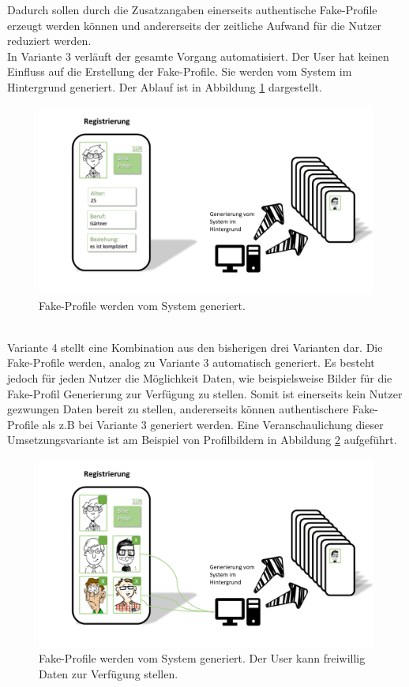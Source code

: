 \documentclass{sigchi}
\begin{document}
Dadurch sollen durch die Zusatzangaben einerseits authentische Fake-Profile erzeugt werden können und andererseits der zeitliche Aufwand für die Nutzer reduziert werden. \\
In Variante 3 verläuft der gesamte Vorgang automatisiert. Der User hat keinen Einfluss auf die Erstellung der Fake-Profile. Sie werden vom System im Hintergrund generiert. Der Ablauf ist in Abbildung \ref{fig:Umsetzung3} dargestellt.
\begin{figure}[htbp]
\centering
	\includegraphics[width=0.8\columnwidth]{figures/Umsetzung3.PNG}
	\caption{Fake-Profile werden vom System generiert.}
	\label{fig:Umsetzung3}
\end{figure}
\\
Variante 4 stellt eine Kombination aus den bisherigen drei Varianten dar. Die Fake-Profile werden, analog zu Variante 3 automatisch generiert. Es besteht jedoch für jeden Nutzer die Möglichkeit Daten, wie beispielsweise Bilder für die Fake-Profil Generierung zur Verfügung zu stellen. Somit ist einerseits kein Nutzer gezwungen Daten bereit zu stellen, andererseits können authentischere Fake-Profile als z.B bei Variante 3 generiert werden. Eine Veranschaulichung dieser Umsetzungsvariante ist am Beispiel von Profilbildern in Abbildung \ref{fig:Umsetzung4} aufgeführt. 
\begin{figure}[htbp]
\centering
	\includegraphics[width=\columnwidth]{figures/Umsetzung4.PNG}
	\caption{Fake-Profile werden vom System generiert. Der User kann freiwillig Daten zur Verfügung stellen.}
	\label{fig:Umsetzung4}
\end{figure}
\end{document}
